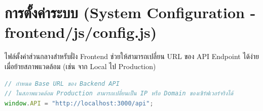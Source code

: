 \section{การตั้งค่าระบบ (System Configuration - frontend/js/config.js)}
ไฟล์ตั้งค่าส่วนกลางสำหรับฝั่ง Frontend ช่วยให้สามารถเปลี่ยน URL ของ API Endpoint ได้ง่ายเมื่อย้ายสภาพแวดล้อม (เช่น จาก Local ไป Production)

\begin{lstlisting}[language=JavaScript, caption={Global Configuration}, label={lst:frontend_config}]
// กำหนด Base URL ของ Backend API
// ในสภาพแวดล้อม Production สามารถเปลี่ยนเป็น IP หรือ Domain ของเซิร์ฟเวอร์จริงได้
window.API = "http://localhost:3000/api";
\end{lstlisting}
